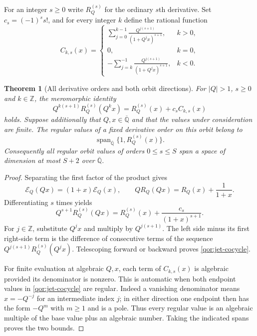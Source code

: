 \documentclass[11pt,a4paper]{article}
\newtheorem{theorem}{Theorem}[section]
\theoremstyle{definition}\newtheorem{definition}[theorem]{Definition}
\theoremstyle{remark}\newtheorem{remark}[theorem]{Remark}
\begin{document}
For an integer $s\geq0$ write $R_Q^{(s)}$ for the ordinary $s$th
derivative.  Set $c_s=(-1)^ss!$, and for every integer $k$ define
the rational function
\begin{equation}\label{qor:C}
 C_{k,s}(x)=
 \begin{cases}
 \displaystyle\sum_{j=0}^{k-1}
       \frac{Q^{j(s+1)}}{(1+Q^jx)^{s+1}},&k>0,\\[6pt]
 0,&k=0,\\[3pt]
 \displaystyle-\sum_{j=k}^{-1}
       \frac{Q^{j(s+1)}}{(1+Q^jx)^{s+1}},&k<0.
 \end{cases}
\end{equation}

\begin{theorem}[All derivative orders and both orbit directions]
\label{qor:jets}
For $|Q|>1$, $s\geq0$ and $k\in\mathbb Z$, the meromorphic identity
\begin{equation}\label{qor:jet-cocycle}
 Q^{k(s+1)}R_Q^{(s)}(Q^kx)
       =R_Q^{(s)}(x)+c_s C_{k,s}(x)
\end{equation}
holds.  Suppose additionally that $Q,x\in\overline{\mathbb Q}$
and that the values under consideration are finite.  The regular
values of a fixed derivative order on this orbit belong to
\[
 \operatorname{span}_{\overline{\mathbb Q}}
       \{1,R_Q^{(s)}(x)\}.
\]
Consequently all regular orbit values of orders $0\leq s\leq S$
span a space of dimension at most $S+2$ over
$\overline{\mathbb Q}$.
\end{theorem}
\begin{proof}
Separating the first factor of the product gives
\[
 \mathcal E_Q(Qx)=(1+x)\mathcal E_Q(x),\qquad
 QR_Q(Qx)=R_Q(x)+\frac1{1+x}.
\]
Differentiating $s$ times yields
\[
 Q^{s+1}R_Q^{(s)}(Qx)
       =R_Q^{(s)}(x)+\frac{c_s}{(1+x)^{s+1}}.
\]
For $j\in\mathbb Z$, substitute $Q^jx$ and multiply by
$Q^{j(s+1)}$.  The left side minus its first right-side term is
the difference of consecutive terms of the sequence
$Q^{j(s+1)}R_Q^{(s)}(Q^jx)$.  Telescoping forward or backward proves
\eqref{qor:jet-cocycle}.

For finite evaluation at algebraic $Q,x$, each term of
$C_{k,s}(x)$ is algebraic provided its denominator is nonzero.
This is automatic when both endpoint values in
\eqref{qor:jet-cocycle} are regular.  Indeed a vanishing denominator
means $x=-Q^{-j}$ for an intermediate index $j$; in either direction
one endpoint then has the form $-Q^m$ with $m\geq1$ and is a pole.
Thus every regular value is an algebraic multiple of the base
value plus an algebraic number.  Taking the indicated spans proves
the two bounds.
\end{proof}
\end{document}
